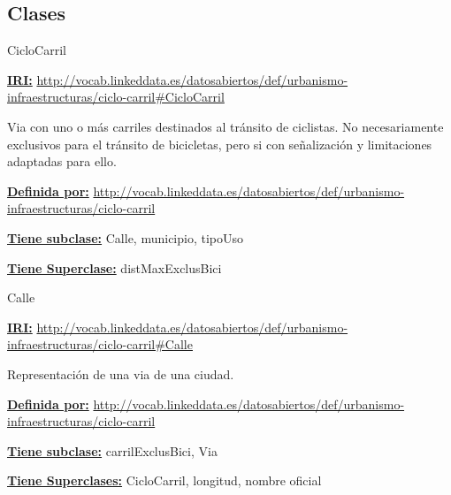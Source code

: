 \subsection{Clases}



\begin{mybox}{CicloCarril}
\begin{flushleft}
\underline{\textbf{IRI:}}
\url{http://vocab.linkeddata.es/datosabiertos/def/urbanismo-infraestructuras/ciclo-carril#CicloCarril}
\newline

Via con uno o más carriles destinados al tránsito de ciclistas. No necesariamente exclusivos para el tránsito de bicicletas, pero si con señalización y limitaciones adaptadas para ello.
\newline

\underline{\textbf{Definida por:}}
\url{http://vocab.linkeddata.es/datosabiertos/def/urbanismo-infraestructuras/ciclo-carril}
\newline

\underline{\textbf{Tiene subclase:}}
\newline Calle,\hspace{2em} municipio,\hspace{2em} tipoUso
\newline 

\underline{\textbf{Tiene Superclase:}}
\newline distMaxExclusBici

\end{flushleft}
\end{mybox}





\begin{mybox}{Calle}
\begin{flushleft}
\underline{\textbf{IRI:}}
\url{http://vocab.linkeddata.es/datosabiertos/def/urbanismo-infraestructuras/ciclo-carril#Calle}
\newline

Representación de una via de una ciudad.
\newline

\underline{\textbf{Definida por:}}
\url{http://vocab.linkeddata.es/datosabiertos/def/urbanismo-infraestructuras/ciclo-carril}
\newline

\underline{\textbf{Tiene subclase:}}
\newline carrilExclusBici,\hspace{2em} Via
\newline 

\underline{\textbf{Tiene Superclases:}}
\newline CicloCarril,\hspace{2em} longitud,\hspace{2em} nombre oficial

\end{flushleft}
\end{mybox}

